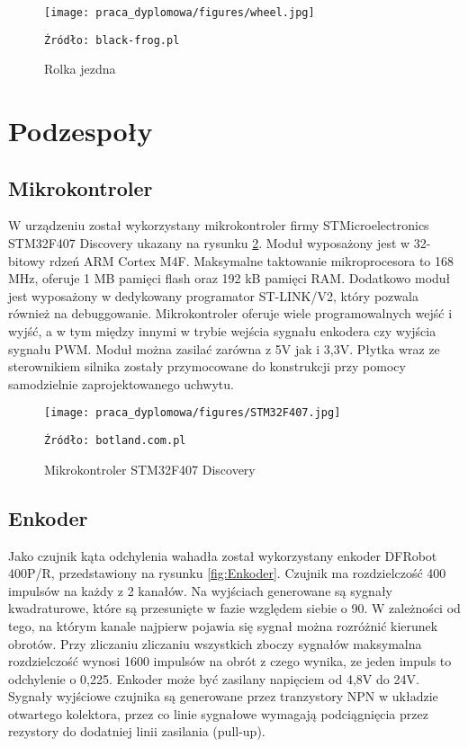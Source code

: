 \begin{figure}
    \centering
    \texttt{[image: praca\_dyplomowa/figures/wheel.jpg]}
    \caption{Rolka jezdna}
    \texttt{Źródło: black-frog.pl}
    \label{fig:Rolka}
\end{figure}

\section{Podzespoły}

\subsection{Mikrokontroler}
\label{sec:STM32}
W urządzeniu został wykorzystany mikrokontroler firmy STMicroelectronics STM32F407 Discovery ukazany na rysunku \ref{fig:STM32}. Moduł wyposażony jest w 32-bitowy rdzeń ARM Cortex M4F. Maksymalne taktowanie mikroprocesora to 168 MHz, oferuje 1 MB pamięci flash oraz 192 kB pamięci RAM. Dodatkowo moduł jest wyposażony w dedykowany programator ST-LINK/V2, który pozwala również na debuggowanie. Mikrokontroler oferuje wiele programowalnych wejść i wyjść, a w tym między innymi w trybie wejścia sygnału enkodera czy wyjścia sygnału PWM. Moduł można zasilać zarówna z 5V jak i 3,3V. Płytka wraz ze sterownikiem silnika zostały przymocowane do konstrukcji przy pomocy samodzielnie zaprojektowanego uchwytu. 

\begin{figure}
    \centering
    \texttt{[image: praca\_dyplomowa/figures/STM32F407.jpg]}
    \caption{Mikrokontroler STM32F407 Discovery}
    \texttt{Źródło: botland.com.pl}
    \label{fig:STM32}
\end{figure}

\subsection{Enkoder}
Jako czujnik kąta odchylenia wahadła został wykorzystany enkoder DFRobot 400P/R, przedstawiony na rysunku \ref{fig:Enkoder}. Czujnik ma rozdzielczość 400 impulsów na każdy z 2 kanałów. Na wyjściach generowane są sygnały kwadraturowe, które są przesunięte w fazie względem siebie o 90\degree. W zależności od tego, na którym kanale najpierw pojawia się sygnał można rozróżnić kierunek obrotów. Przy zliczaniu zliczaniu wszystkich zboczy sygnałów maksymalna rozdzielczość wynosi 1600 impulsów na obrót z czego wynika, ze jeden impuls to odchylenie o 0,225\degree. Enkoder może być zasilany napięciem od 4,8V do 24V. Sygnały wyjściowe czujnika są generowane przez tranzystory NPN w układzie otwartego kolektora, przez co linie sygnałowe wymagają podciągnięcia przez rezystory do dodatniej linii zasilania (pull-up).

